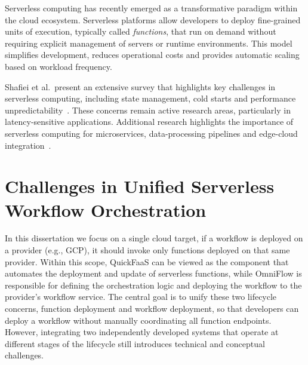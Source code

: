 Serverless computing has recently emerged as a transformative paradigm within the cloud ecosystem. Serverless platforms allow developers to deploy fine-grained units of execution, typically called \textit{functions}, that run on demand without requiring explicit management of servers or runtime environments. This model simplifies development, reduces operational costs and provides automatic scaling based on workload frequency.

Shafiei et al.\ present an extensive survey that highlights key challenges in serverless computing, including state management, cold starts and performance unpredictability~\cite{serverlessComputing}. These concerns remain active research areas, particularly in latency-sensitive applications. Additional research highlights the importance of serverless computing for microservices, data-processing pipelines and edge-cloud integration~\cite{jonas2019cloudProgramming}.

\section{Challenges in Unified Serverless Workflow Orchestration}
\label{sec:int_cha_int_uni_multi}

In this dissertation we focus on a single cloud target, if a workflow is deployed on a provider (e.g., GCP), it should invoke only functions deployed on that same provider.
Within this scope, QuickFaaS can be viewed as the component that automates the deployment and update of serverless functions, while OmniFlow is responsible for defining the orchestration logic and deploying the workflow to the provider's workflow service.
The central goal is to unify these two lifecycle concerns, function deployment and workflow deployment, so that developers can deploy a workflow without manually coordinating all function endpoints.
However, integrating two independently developed systems that operate at different stages of the lifecycle still introduces technical and conceptual challenges.

